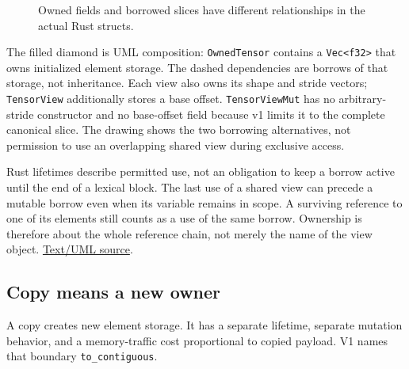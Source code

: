 \documentclass[
  10pt,
]{article}
\begin{document}
\begin{figure}[H]\centering\resizebox{\linewidth}{!}{}\caption{Owned fields and borrowed slices have different relationships in the actual Rust structs.}\end{figure}

The filled diamond is UML composition: \texttt{OwnedTensor} contains a
\texttt{Vec\textless{}f32\textgreater{}} that owns initialized element
storage. The dashed dependencies are borrows of that storage, not
inheritance. Each view also owns its shape and stride vectors;
\texttt{TensorView} additionally stores a base offset.
\texttt{TensorViewMut} has no arbitrary-stride constructor and no
base-offset field because v1 limits it to the complete canonical slice.
The drawing shows the two borrowing alternatives, not permission to use
an overlapping shared view during exclusive access.

Rust lifetimes describe permitted use, not an obligation to keep a
borrow active until the end of a lexical block. The last use of a shared
view can precede a mutable borrow even when its variable remains in
scope. A surviving reference to one of its elements still counts as a
use of the same borrow. Ownership is therefore about the whole reference
chain, not merely the name of the view object.
\href{https://github.com/hermonai/inside-the-llm-engine/blob/astra-visual-rewrite/figures/generated/tensor-ownership.txt}{Text/UML
source}.

\subsection{Copy means a new owner}\label{copy-means-a-new-owner}

A copy creates new element storage. It has a separate lifetime, separate
mutation behavior, and a memory-traffic cost proportional to copied
payload. V1 names that boundary \texttt{to\_contiguous}.
\end{document}
